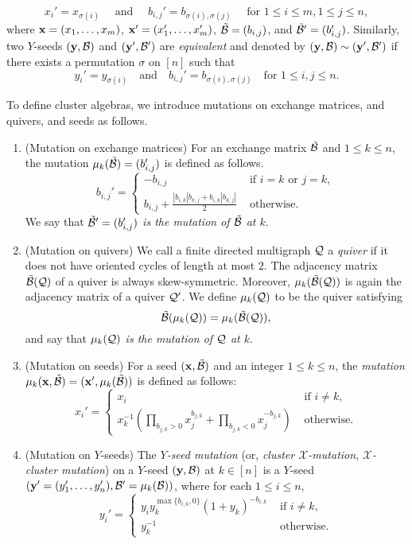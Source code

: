 \[
x_i' = x_{\sigma(i)}\quad \text{ and } \quad b_{i,j}' = b_{\sigma(i),\sigma(j)} \quad \text{ for }1\le i\le m, 1\le j\le n,
\]
where $\mathbf{x} = (x_{1},\dots,x_{m})$, $\mathbf{x}' = (x_1',\dots,x_m')$, $\mathcal{\tilde{B}} = (b_{i,j})$, and $\mathcal{\tilde{B}}' = (b_{i,j}')$. Similarly,
two $Y$-seeds $(\mathbf{y},\mathcal{B})$ and $(\mathbf{y}',\mathcal{B}')$ are \emph{equivalent} and denoted by $(\mathbf{y},\mathcal{B})\sim(\mathbf{y}',\mathcal{B}')$ if there exists a permutation $\sigma$ on $[n]$ such that %
\[
y_i' = y_{\sigma(i)}\quad\text{and}\quad
b_{i,j}' = b_{\sigma(i),\sigma(j)}\quad\text{for }1\le i,j \le n.
\]

To define cluster algebras, we introduce mutations on exchange matrices, and quivers, and seeds as follows. 
\begin{enumerate}
\item (Mutation on exchange matrices)
For an exchange matrix $\mathcal{\tilde{B}}$ and $1 \le k \le n$, the mutation $\mu_k(\mathcal{\tilde{B}}) = (b_{i,j}')$ is defined as follows.
\[
b_{i,j}' = \begin{cases}
-b_{i,j} & \text{ if } i = k \text{ or } j = k, \\
\displaystyle b_{i,j} + \frac{|b_{i,k}| b_{k,j} + b_{i,k} | b_{k,j}|} {2} & \text{ otherwise}.
\end{cases}
\]
We say that \emph{$\mathcal{\tilde{B}}' =(b_{i,j}')$ is the mutation of $\mathcal{\tilde{B}}$ at $k$}.
\item (Mutation on quivers)
We call a finite directed multigraph $\mathcal{Q}$ a \emph{quiver} if it does not have
oriented cycles of length at most $2$. The adjacency matrix $\mathcal{\tilde{B}}(\mathcal{Q})$ of a
quiver is always skew-symmetric. Moreover, $\mu_k(\mathcal{\tilde{B}}(\mathcal{Q}))$ is again 
the adjacency matrix of a quiver $\mathcal{Q}'$. We define $\mu_k(\mathcal{Q})$ to be 
the quiver satisfying 
\[
 \mathcal{\tilde{B}}(\mu_k(\mathcal{Q})) = \mu_k(\mathcal{\tilde{B}}(\mathcal{Q})),
\]
and say that \emph{$\mu_k(\mathcal{Q})$ is the mutation of $\mathcal{Q}$ at $k$}.
\item (Mutation on seeds)	For a seed $(\mathbf{x}, \mathcal{\tilde{B}})$ and an integer $1 \leq k \leq n$, the \emph{mutation} $\mu_k(\mathbf{x}, \mathcal{\tilde{B}}) = (\mathbf{x}', \mu_k(\mathcal{\tilde{B}}))$ is defined as follows: 
\begin{equation*}%
x_i' = \begin{cases}
x_i &\text{ if } i \neq k,\\
\displaystyle 
x_k^{-1}\left( \prod_{b_{j,k} > 0} x_j^{b_{j,k}} + \prod_{b_{j,k} < 0}x_j^{-b_{j,k}}
\right) & \text{ otherwise}.
\end{cases}
\end{equation*}
\item (Mutation on $Y$-seeds)
The \emph{$Y$-seed mutation} (or, \emph{cluster $\mathcal{X}$-mutation}, \emph{$\mathcal{X}$-cluster mutation}) on a $Y$-seed $(\mathbf{y}, \mathcal{B})$ at $k\in[n]$ is a $Y$-seed $(\mathbf{y}'=(y_1',\dots, y_n'),\mathcal{B}'=\mu_k(\mathcal{B}))$, where for each $1 \le i\le n$,
\[
y_i' = \begin{cases}
    \displaystyle {y}_{i} {y}_{k}^{\max\{b_{i,k},0\}}(1+{y}_{k})^{-b_{i,k}} & \text{ if }i \neq k, \\
   {y}_{k}^{-1} &\text{ otherwise}.
\end{cases}
\]


\end{enumerate}


